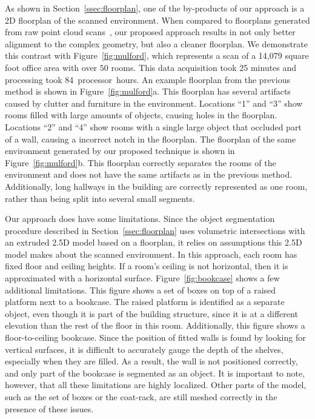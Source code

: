 \documentclass[review]{acmsiggraph}
\begin{document}
As shown in Section~\ref{ssec:floorplan}, one of the by-products of our approach is a 2D floorplan of the scanned environment.  When compared to floorplans generated from raw point cloud scans~\cite{Turner14}, our proposed approach results in not only better alignment to the complex geometry, but also a cleaner floorplan.  We demonstrate this contrast with Figure~\ref{fig:mulford}, which represents a scan of a 14,079 square foot office area with over $50$ rooms.  This data acquisition took 25 minutes and processing took 84~processor~hours.  An example floorplan from the previous method is shown in Figure~\ref{fig:mulford}a.  This floorplan has several artifacts caused by clutter and furniture in the environment.  Locations ``1'' and ``3'' show rooms filled with large amounts of objects, causing holes in the floorplan.  Locations ``2'' and ``4'' show rooms with a single large object that occluded part of a wall, causing a incorrect notch in the floorplan.  The floorplan of the same environment generated by our proposed technique is shown in Figure~\ref{fig:mulford}b.  This floorplan correctly separates the rooms of the environment and does not have the same artifacts as in the previous method.  Additionally, long hallways in the building are correctly represented as one room, rather than being split into several small segments.

Our approach does have some limitations.  Since the object segmentation procedure described in Section~\ref{ssec:floorplan} uses volumetric intersections with an extruded 2.5D model based on a floorplan, it relies on assumptions this 2.5D model makes about the scanned environment.  In this approach, each room has fixed floor and ceiling heights.  If a room's ceiling is not horizontal, then it is approximated with a horizontal surface.  Figure~\ref{fig:bookcase} shows a few additional limitations.  This figure shows a set of boxes on top of a raised platform next to a bookcase.  The raised platform is identified as a separate object, even though it is part of the building structure, since it is at a different elevation than the rest of the floor in this room.  Additionally, this figure shows a floor-to-ceiling bookcase.  Since the position of fitted walls is found by looking for vertical surfaces, it is difficult to accurately gauge the depth of the shelves, especially when they are filled.  As a result, the wall is not positioned correctly, and only part of the bookcase is segmented as an object.  It is important to note, however, that all these limitations are highly localized.  Other parts of the model, such as the set of boxes or the coat-rack, are still meshed correctly in the presence of these issues.
\end{document}
